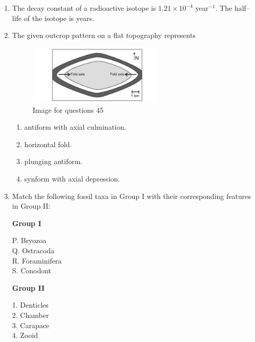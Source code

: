 \documentclass[journal,12pt,onecolumn]{IEEEtran}
\theoremstyle{remark}
\begin{document}
\begin{enumerate}
\item The decay constant of a radioactive isotope is $1.21 \times 10^{-4}$ year$^{-1}$. The half--life of the isotope is \underline{\hspace{10mm}} years.
\vspace{0.5cm}

\item The given outcrop pattern on a flat topography represents

\begin{figure}[H]
    \centering
    \includegraphics[width=0.6\textwidth]{figs/fig6.png}
    \caption{Image for questions 45}
    \label{fig:question45}
\end{figure}
\vspace{0.5cm}




\begin{enumerate}
\item antiform with axial culmination.
\item horizontal fold.
\item plunging antiform.
\item synform with axial depression.
\end{enumerate}
\vspace{0.5cm}


\item Match the following fossil taxa in Group I with their corresponding features in Group II:

\begin{multicols}{2}
\textbf{Group I}
\begin{flushleft}
P. Bryozoa\\
Q. Ostracoda\\
R. Foraminifera\\
S. Conodont
\end{flushleft}

\columnbreak

\textbf{Group II}
\begin{flushleft}
1. Denticles\\
2. Chamber\\
3. Carapace\\
4. Zooid
\end{flushleft}
\end{multicols}


\end{enumerate}
\end{document}
